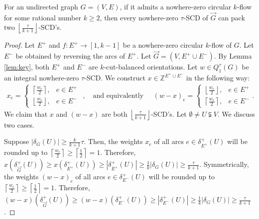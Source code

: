 \documentclass[runningheads]{llncs}
\newcommand{\rounddown}[1]{\left\lfloor#1\right\rfloor}
\newcommand{\roundup}[1]{\left\lceil#1\right\rceil}
\newcommand{\Z}{\mathbb{Z}}
\begin{document}
\begin{theorem}\label{thm:decompose_SCD}
    For an undirected graph $G=(V,E)$, if it admits a nowhere-zero circular $k$-flow for some rational number $k\geq 2$, then every nowhere-zero $\tau$-SCD of $\vec{G}$ can pack two $\rounddown{\frac{\tau}{k+1}}$-SCD's.
\end{theorem}
    \begin{proof}
        Let $E^+$ and $f:E^+\rightarrow [1,k-1]$ be a nowhere-zero circular $k$-flow of $G$. Let $E^-$ be obtained by reversing the arcs of $E^+$. Let $\vec{G}=(V,E^+\cup E^-)$. By Lemma \ref{lem:key}, both $E^+$ and $E^-$ are $k$-cut-balanced orientations. Let $w\in Q_1^\tau(G)$ be an integral nowhere-zero $\tau$-SCD. We construct $x\in \Z^{E^+\cup E^-}$ in the following way:
        \begin{equation*}
            \begin{aligned}
                x_e=\begin{cases}
                    \roundup{\frac{w_e}{2}}, & e\in E^+\\
                    \rounddown{\frac{w_e}{2}}, & e\in E^-
                \end{cases}
            \end{aligned},
            \quad\text{and equivalently}\quad 
            \begin{aligned}
                (w-x)_e=\begin{cases}
                    \rounddown{\frac{w_e}{2}}, & e\in E^+\\
                    \roundup{\frac{w_e}{2}}, & e\in E^-
                \end{cases}.
            \end{aligned}
        \end{equation*}
    We claim that $x$ and $(w-x)$ are both $\rounddown{\frac{\tau}{k+1}}$-SCD's. Let $\emptyset \neq U \subsetneqq V$. We discuss two cases. 
        
        Suppose $|\delta_G(U)|\geq \frac{k}{k+1}\tau$. Then, the weights $x_e$ of all arcs $e\in\delta_{E^+}^+(U)$ will be rounded up to $\roundup{\frac{w_e}{2}}\geq \roundup{\frac{1}{2}}=1$. Therefore, $x(\delta_{\vec{G}}^+(U))\geq x(\delta_{E^+}^+(U)) \geq |\delta_{E^+}^+(U)|\geq \frac{1}{k}|\delta_{G}(U)|\geq \frac{\tau}{k+1}$.
        Symmetrically, the weights $(w-x)_e$ of all arcs $e\in\delta_{E^-}^+(U)$ will be rounded up to $\roundup{\frac{w_e}{2}}\geq \roundup{\frac{1}{2}}=1$. Therefore, $(w-x)(\delta_{\vec{G}}^+(U))\geq (w-x)(\delta_{E^-}^+(U))\geq  |\delta_{E^-}^+(U)|\geq \frac{1}{k}|\delta_{G}(U)|\geq \frac{\tau}{k+1}$. 
        

\end{proof}
\end{document}

